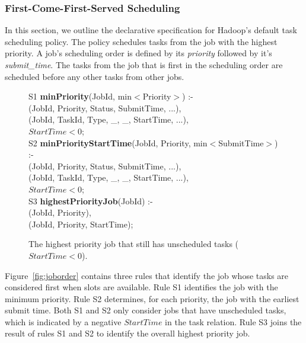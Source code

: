 \subsubsection{First-Come-First-Served Scheduling}

In this section, we outline the declarative specification for Hadoop's default
task scheduling policy. The policy schedules tasks from the job with the
highest priority. A job's scheduling order is defined by its {\em priority} followed by it's 
{\em submit\_time}. The tasks from the job that is first in the scheduling order are
scheduled before any other tasks from other jobs. 

\begin{figure}
\label{fig:joborder}
\ssp
\centering
\begin{boxedminipage}{\linewidth}
S1 {\bf minPriority}(JobId, min$<$Priority$>$) :- \\
(JobId, Priority, Status, SubmitTime, ...), \\
(JobId, TaskId, Type, \_, \_, StartTime, ...), \\
\datalogspace $StartTime < 0$; \\
	
S2 {\bf minPriorityStartTime}(JobId, Priority, min$<$SubmitTime$>$) :- \\
(JobId, Priority, Status, SubmitTime, ...), \\
(JobId, TaskId, Type, \_, \_, StartTime, ...), \\
\datalogspace $StartTime < 0$; \\

S3 {\bf highestPriorityJob}(JobId) :- \\
(JobId, Priority), \\
(JobId, Priority, StartTime); \\
\end{boxedminipage}
\caption{\label{fig:planseed}The highest priority job that still has unscheduled tasks ($StartTime < 0$).}
\end{figure}

Figure~\ref{fig:joborder} contains three rules that identify the job whose tasks are considered first
when \TT slots are available. Rule S1 identifies the job with the minimum priority. Rule S2 determines,
for each priority, the job with the earliest submit time. Both S1 and S2 only consider jobs that have unscheduled
tasks, which is indicated by a negative $StartTime$ in the task relation. Rule S3 joins the result of rules S1 and S2
to identify the overall highest priority job. 

